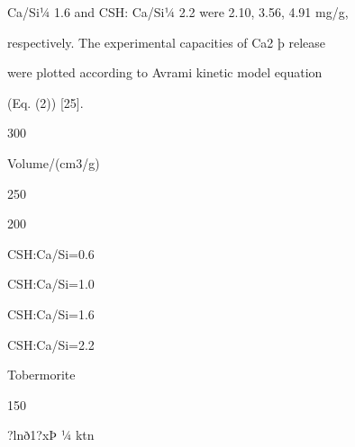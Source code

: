 \documentclass[a4paper,portrait,12pt]{article}
\begin{document}
\begin{flushleft}
Ca/Si¼ 1.6 and CSH: Ca/Si¼ 2.2 were 2.10, 3.56, 4.91 mg/g,
\end{flushleft}


\begin{flushleft}
respectively. The experimental capacities of Ca2 þ release
\end{flushleft}


\begin{flushleft}
were plotted according to Avrami kinetic model equation
\end{flushleft}


\begin{flushleft}
(Eq. (2)) [25].
\end{flushleft}





300





\begin{flushleft}
Volume/(cm3/g)
\end{flushleft}





250


200





\begin{flushleft}
CSH:Ca/Si=0.6
\end{flushleft}


\begin{flushleft}
CSH:Ca/Si=1.0
\end{flushleft}


\begin{flushleft}
CSH:Ca/Si=1.6
\end{flushleft}


\begin{flushleft}
CSH:Ca/Si=2.2
\end{flushleft}


\begin{flushleft}
Tobermorite
\end{flushleft}





150





\begin{flushleft}
?lnð1?xÞ ¼ ktn
\end{flushleft}
\end{document}
